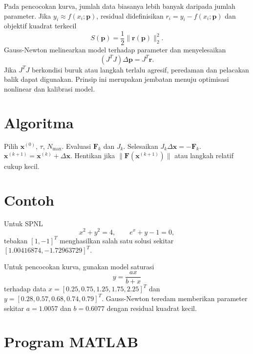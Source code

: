 \documentclass[book,english,noindex,lean,nobackpage,nocopyright,noupdate,nofiglist,notablist]{enacom}
\begin{document}
Pada pencocokan kurva, jumlah data biasanya lebih banyak daripada jumlah parameter. Jika $y_i\approx f(x_i;\mathbf{p})$, residual didefinisikan $r_i=y_i-f(x_i;\mathbf{p})$ dan objektif kuadrat terkecil
\begin{equation}
S(\mathbf{p})=\frac12\|\mathbf{r}(\mathbf{p})\|_2^2.
\end{equation}
Gauss-Newton melinearkan model terhadap parameter dan menyelesaikan
\begin{equation}
(J^TJ)\Delta\mathbf{p}=J^T\mathbf{r}.
\end{equation}
Jika $J^TJ$ berkondisi buruk atau langkah terlalu agresif, peredaman dan pelacakan balik dapat digunakan. Prinsip ini merupakan jembatan menuju optimisasi nonlinear dan kalibrasi model.

\section{Algoritma}
\begin{algorithm}
\caption{Newton untuk sistem nonlinear}
\begin{algorithmic}[1]
\State Pilih $\mathbf{x}^{(0)}$, $\tau$, $N_{\max}$.
\State Evaluasi $\mathbf{F}_k$ dan $J_k$.
\State Selesaikan $J_k\Delta\mathbf{x}=-\mathbf{F}_k$.
\State $\mathbf{x}^{(k+1)}=\mathbf{x}^{(k)}+\Delta\mathbf{x}$.
\State Hentikan jika $\|\mathbf{F}(\mathbf{x}^{(k+1)})\|$ atau langkah relatif cukup kecil.
\EndFor
\end{algorithmic}
\end{algorithm}

\section{Contoh}
Untuk SPNL
\begin{equation}
x^2+y^2=4,\qquad e^x+y-1=0,
\end{equation}
tebakan $[1,-1]^T$ menghasilkan salah satu solusi sekitar $[1.00416874,-1.72963729]^T$.

Untuk pencocokan kurva, gunakan model saturasi
\begin{equation}
y=\frac{a x}{b+x}
\end{equation}
terhadap data $x=[0.25,0.75,1.25,1.75,2.25]^T$ dan $y=[0.28,0.57,0.68,0.74,0.79]^T$. Gauss-Newton teredam memberikan parameter sekitar $a=1.0057$ dan $b=0.6077$ dengan residual kuadrat kecil.

\section{Program MATLAB}



\end{document}
